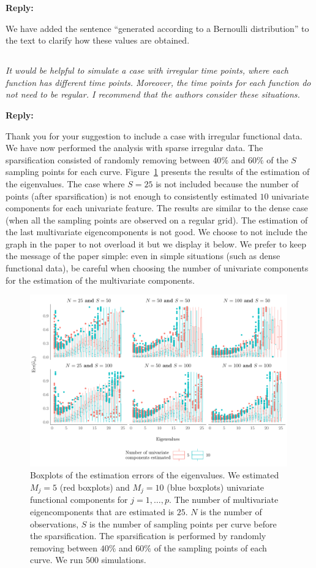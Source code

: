 \documentclass[12pt,a4paper]{article}
\newcommand{\comments}[1]{\subsection{}
\begin{mdframed}[style=comments] 
        \textit{#1}
\end{mdframed}}
\newcommand{\reply}[1]{
    \noindent\textbf{Reply:}

\begin{mdframed}[style=replies] 
    #1
\end{mdframed}
}
\begin{document}
\reply{We have added the sentence ``generated according to a Bernoulli distribution'' to the text to clarify how these values are obtained.}


\comments{It would be helpful to simulate a case with irregular time points, where each function has different time points. Moreover, the time points for each function do not need to be regular. I recommend that the authors consider these situations.}

\reply{Thank you for your suggestion to include a case with irregular functional data. We have now performed the analysis with sparse irregular data. The sparsification consisted of randomly removing between $40\%$ and $60\%$ of the $S$ sampling points for each curve. Figure~\ref{fig:ncomp} presents the results of the estimation of the eigenvalues. The case where $S = 25$ is not included because the number of points (after sparsification) is not enough to consistently estimated $10$ univariate components for each univariate feature. The results are similar to the dense case (when all the sampling points are observed on a regular grid). The estimation of the last multivariate eigencomponents is not good. We choose to not include the graph in the paper to not overload it but we display it below. We prefer to keep the message of the paper simple: even in simple situations (such as dense functional data), be careful when choosing the number of univariate components for the estimation of the multivariate components.}
\begin{figure}[!h]
     \centering
    \includegraphics[width=0.99\textwidth]{ncomp.pdf}
    \caption{Boxplots of the estimation errors of the eigenvalues. We estimated $M_j = 5$ (red boxplots) and $M_j = 10$ (blue boxplots) univariate functional components for $j = 1, \dots, p$. The number of multivariate eigencomponents that are estimated is $25$. $N$ is the number of observations, $S$ is the number of sampling points per curve before the sparsification. The sparsification is performed by randomly removing between $40\%$ and $60\%$ of the sampling points of each curve. We run $500$ simulations.}
    \label{fig:ncomp}
\end{figure}
\end{document}
